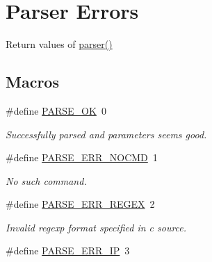 \hypertarget{group___return_parser}{\section{Parser Errors}
\label{group___return_parser}
}


Return values of \hyperlink{cli_8c_acc286b66b5b52e4d8d11e5f6990ce425}{parser()}  


\subsection*{Macros}
\begin{DoxyCompactItemize}
\item 
\hypertarget{group___return_parser_ga9108cd1d4c34413cc6e69b4585b5f9e2}{\#define \hyperlink{group___return_parser_ga9108cd1d4c34413cc6e69b4585b5f9e2}{P\-A\-R\-S\-E\-\_\-\-O\-K}~0}\label{group___return_parser_ga9108cd1d4c34413cc6e69b4585b5f9e2}

\begin{DoxyCompactList}\small\item\em Successfully parsed and parameters seems good. \end{DoxyCompactList}\item 
\hypertarget{group___return_parser_ga8d7ab4bd3273f624edb37dc307a64d2b}{\#define \hyperlink{group___return_parser_ga8d7ab4bd3273f624edb37dc307a64d2b}{P\-A\-R\-S\-E\-\_\-\-E\-R\-R\-\_\-\-N\-O\-C\-M\-D}~1}\label{group___return_parser_ga8d7ab4bd3273f624edb37dc307a64d2b}

\begin{DoxyCompactList}\small\item\em No such command. \end{DoxyCompactList}\item 
\hypertarget{group___return_parser_ga96135b0d207927966bc64801c7cdc7d4}{\#define \hyperlink{group___return_parser_ga96135b0d207927966bc64801c7cdc7d4}{P\-A\-R\-S\-E\-\_\-\-E\-R\-R\-\_\-\-R\-E\-G\-E\-X}~2}\label{group___return_parser_ga96135b0d207927966bc64801c7cdc7d4}

\begin{DoxyCompactList}\small\item\em Invalid regexp format specified in c source. \end{DoxyCompactList}\item 
\hypertarget{group___return_parser_ga83ab6a4a01e7eb75bfef0d1e3a737827}{\#define \hyperlink{group___return_parser_ga83ab6a4a01e7eb75bfef0d1e3a737827}{P\-A\-R\-S\-E\-\_\-\-E\-R\-R\-\_\-\-I\-P}~3}\label{group___return_parser_ga83ab6a4a01e7eb75bfef0d1e3a737827}


\end{DoxyCompactItemize}
